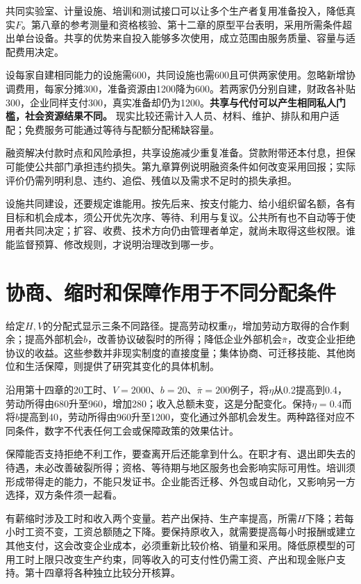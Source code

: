 \documentclass[UTF8,fontset=windows,12pt,a4paper,oneside,openany]{ctexbook}
\begin{document}
共同实验室、计量设施、培训和测试接口可以让多个生产者复用准备投入，降低真实$F$。第八章的参考测量和资格核验、第十二章的原型平台表明，采用所需条件超出单台设备。共享的优势来自投入能够多次使用，成立范围由服务质量、容量与适配费用决定。

设每家自建相同能力的设施需600，共同设施也需600且可供两家使用。忽略新增协调费用，每家分摊300，准备资源由1200降为600。若两家仍分别自建，财政各补贴300，企业同样支付300，真实准备却仍为1200。\textbf{共享与代付可以产生相同私人门槛，社会资源结果不同。} 现实比较还需计入人员、材料、维护、排队和用户适配；免费服务可能通过等待与配额分配稀缺容量。

融资解决付款时点和风险承担，共享设施减少重复准备。贷款附带还本付息，担保可能使公共部门承担违约损失。第九章算例说明融资条件如何改变采用回报；实际评价仍需列明利息、违约、追偿、残值以及需求不足时的损失承担。

设施共同建设，还要规定谁能用。按先后来、按支付能力、给小组织留名额，各有目标和机会成本，须公开优先次序、等待、利用与复议。公共所有也不自动等于使用者共同决定；扩容、收费、技术方向仍由管理者单定，就尚未取得这些权限。谁能监督预算、修改规则，才说明治理改到哪一步。

\section{协商、缩时和保障作用于不同分配条件}

给定$H,V$的分配式显示三条不同路径。提高劳动权重$\eta$，增加劳动方取得的合作剩余；提高外部机会$b$，改善协议破裂时的所得；降低企业外部机会$\bar\pi$，改变企业拒绝协议的收益。这些参数并非现实制度的直接度量；集体协商、可迁移技能、其他岗位和生活保障，则提供了研究其变化的具体机制。

沿用第十四章的20工时、$V=2000$、$b=20$、$\bar\pi=200$例子，将$\eta$从0.2提高到0.4，劳动所得由680升至960，增加280；收入总额未变，这是分配变化。保持$\eta=0.4$而将$b$提高到40，劳动所得由960升至1200，变化通过外部机会发生。两种路径对应不同条件，数字不代表任何工会或保障政策的效果估计。

保障能否支持拒绝不利工作，要查离开后还能拿到什么。在职才有、退出即失去的待遇，未必改善破裂所得；资格、等待期与地区服务也会影响实际可用性。培训须形成带得走的能力，不能只发证书。企业能否迁移、外包或自动化，又影响另一方选择，双方条件须一起看。

有薪缩时涉及工时和收入两个变量。若产出保持、生产率提高，所需$H$下降；若每小时工资不变，工资总额随之下降。要保持原收入，就需要提高每小时报酬或建立其他支付，这会改变企业成本，必须重新比较价格、销量和采用。降低原模型的可用工时上限只改变生产约束，同等收入的可支付性仍需工资、产出和现金账户支持。第十四章将各种独立比较分开核算。
\end{document}
